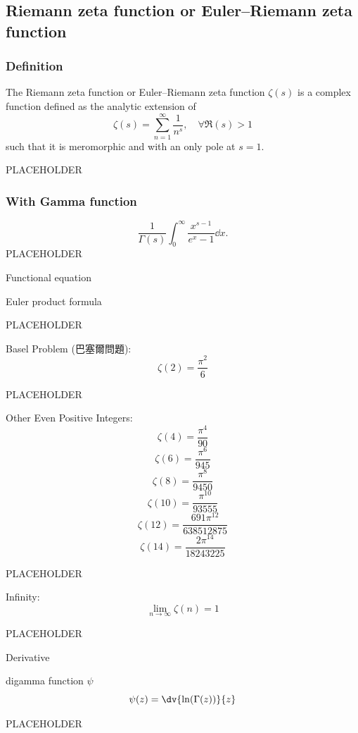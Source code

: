 \subsection{Riemann zeta function or Euler–Riemann zeta function}
\subsubsection{Definition}
The Riemann zeta function or Euler–Riemann zeta function $\zeta(s)$ is a complex function defined as the analytic extension of
\[\zeta(s)=\sum_{n=1}^\infty\frac{1}{n^s},\quad\forall\Re(s)>1\]
such that it is meromorphic and with an only pole at $s=1$.

PLACEHOLDER

\subsubsection{With Gamma function}
\[\frac{1}{\Gamma(s)}\int_0^\infty\frac{x^{s-1}}{e^x-1}\dd{x}.\]
\bpr
PLACEHOLDER
\epr

Functional equation

Euler product formula

PLACEHOLDER

Basel Problem (巴塞爾問題):
\[\zeta(2)=\frac{\pi^2}{6}\]

PLACEHOLDER

Other Even Positive Integers:
\[\zeta(4)=\frac{\pi^4}{90}\]
\[\zeta(6)=\frac{\pi^6}{945}\]
\[\zeta(8)=\frac{\pi^8}{9450}\]
\[\zeta(10)=\frac{\pi^{10}}{93555}\]
\[\zeta(12)=\frac{691\pi^{12}}{638512875}\]
\[\zeta(14)=\frac{2\pi^{14}}{18243225}\]

PLACEHOLDER

Infinity:
\[\lim_{n\to\infty}\zeta(n)=1\]

PLACEHOLDER

Derivative

digamma function $\psi$
\[\psi(z)=\dv{\ln(\Gamma(z))}{z}\]

PLACEHOLDER